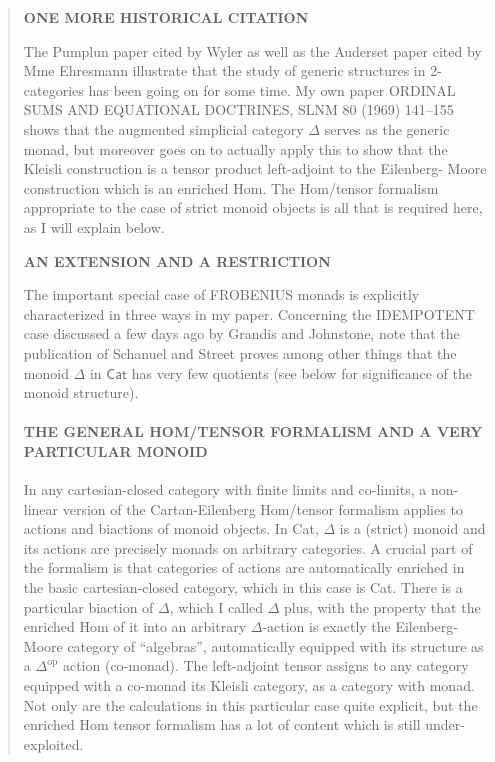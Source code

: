 \documentclass{article}
\begin{document}
\begin{quote}
\textbf{ONE MORE HISTORICAL CITATION}

The Pumplun paper cited by Wyler as well as the Auderset paper cited by
Mme Ehresmann illustrate that the study of generic structures in
2-categories has been going on for some time. My own paper ORDINAL SUMS
AND EQUATIONAL DOCTRINES, SLNM 80 (1969) 141--155 shows that the
augmented simplicial category \(\Delta\) serves as the generic monad,
but moreover goes on to actually apply this to show that the Kleisli
construction is a tensor product left-adjoint to the Eilenberg- Moore
construction which is an enriched Hom. The Hom/tensor formalism
appropriate to the case of strict monoid objects is all that is required
here, as I will explain below.

\textbf{AN EXTENSION AND A RESTRICTION}

The important special case of FROBENIUS monads is explicitly
characterized in three ways in my paper. Concerning the IDEMPOTENT case
discussed a few days ago by Grandis and Johnstone, note that the
publication of Schanuel and Street proves among other things that the
monoid \(\Delta\) in \(\mathsf{Cat}\) has very few quotients (see below
for significance of the monoid structure).

\mbox{}%
\hypertarget{the-general-homtensor-formalism-and-a-very-particular-monoid}{%
\paragraph{THE GENERAL HOM/TENSOR FORMALISM AND A VERY PARTICULAR
MONOID}\label{the-general-homtensor-formalism-and-a-very-particular-monoid}}

In any cartesian-closed category with finite limits and co-limits, a
non-linear version of the Cartan-Eilenberg Hom/tensor formalism applies
to actions and biactions of monoid objects. In Cat, \(\Delta\) is a
(strict) monoid and its actions are precisely monads on arbitrary
categories. A crucial part of the formalism is that categories of
actions are automatically enriched in the basic cartesian-closed
category, which in this case is Cat. There is a particular biaction of
\(\Delta\), which I called \(\Delta\) plus, with the property that the
enriched Hom of it into an arbitrary \(\Delta\)-action is exactly the
Eilenberg-Moore category of ``algebras'', automatically equipped with
its structure as a \(\Delta^{\mathrm{op}}\) action (co-monad). The
left-adjoint tensor assigns to any category equipped with a co-monad its
Kleisli category, as a category with monad. Not only are the
calculations in this particular case quite explicit, but the enriched
Hom tensor formalism has a lot of content which is still
under-exploited.


\end{quote}
\end{document}
